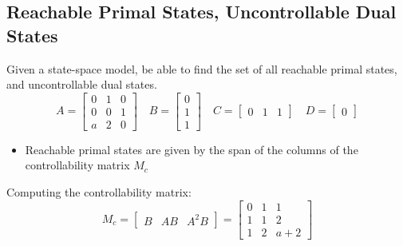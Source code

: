 \subsection{Reachable Primal States, Uncontrollable Dual States}

Given a state-space model, be able to find the set of all reachable primal states, and uncontrollable dual states.
\begin{equation*}
  A=
  \begin{bmatrix}
    0 & 1 & 0 \\
    0 & 0 & 1\\
    a & 2 & 0
  \end{bmatrix}
  \quad B=
  \begin{bmatrix}
    0 \\
    1 \\
    1
  \end{bmatrix}
  \quad C=
  \begin{bmatrix}
    0 & 1 & 1
  \end{bmatrix}
  \quad D=
  \begin{bmatrix}
    0
  \end{bmatrix}
\end{equation*}

\begin{itemize}
  \item{Reachable primal states are given by the span of the columns of the controllability matrix $M_{c}$}
\end{itemize}

Computing the controllability matrix:
\begin{equation*}
  M_{c}=
  \begin{bmatrix}
    B & AB & A^{2}B
  \end{bmatrix}=
  \begin{bmatrix}
    0 & 1 & 1 \\
    1 & 1 & 2 \\
    1 & 2 & a+2
  \end{bmatrix}
\end{equation*}

